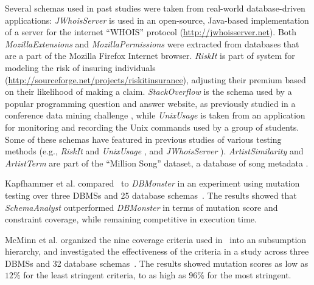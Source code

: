 Several schemas used in past studies were taken from real-world database-driven applications: {\it JWhoisServer} is used
in an open-source, Java-based implementation of a server for the internet ``WHOIS'' protocol
(\url{http://jwhoisserver.net}).  Both {\it MozillaExtensions} and {\it MozillaPermissions} were extracted from \SQLite
databases that are a part of the Mozilla Firefox Internet browser.  {\it RiskIt} is part of system for modeling the risk
of insuring individuals (\url{http://sourceforge.net/projects/riskitinsurance}), adjusting their premium based on their
likelihood of making a claim.  {\it StackOverflow} is the schema used by a popular programming question and answer
website, as previously studied in a conference data mining challenge \cite{MSRChallenge2013}, while {\it UnixUsage} is
taken from an application for monitoring and recording the Unix commands used by a group of students.  Some of these
schemas have featured in previous studies of various testing methods (e.g., {\it RiskIt} and {\it UnixUsage}
\cite{Pan2011b}, and {\it JWhoisServer} \cite{Cobb2011}).  {\it ArtistSimilarity} and {\it ArtistTerm} are part of the
``Million Song'' dataset, a database of song metadata \cite{Bertin-Mahieux2011}.



Kapfhammer et al. compared \sa~to \textit{DBMonster} in an experiment using mutation testing over
three DBMSs and 25 database schemas~\cite{kapfhammer2013search}. The results showed that \textit{SchemaAnalyst}
outperformed \textit{DBMonster} in terms of mutation score and constraint coverage, while remaining competitive in
execution time.

McMinn et al. organized the nine coverage criteria used in \sa~into an subsumption hierarchy, and
investigated the effectiveness of the criteria in a study across three DBMSs and 32 database
schemas~\cite{mcminn2015effectiveness}.  The results showed mutation scores as low as $12\%$ for the least stringent
criteria, to as high as $96\%$ for the most stringent.

